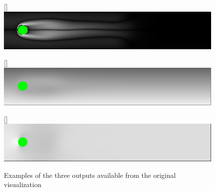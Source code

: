 \begin{figure}[ht]
    \centering
    [\linewidth]{\includegraphics[width=\linewidth,natwidth=660,natheight=120]{Ch20Research/figures/output_zeta.png}
    }
    
    [\linewidth]{\includegraphics[width=\linewidth,natwidth=660,natheight=120]{Ch20Research/figures/output_psi.png}
    }
    
    [\linewidth]{\includegraphics[width=\linewidth,natwidth=660,natheight=120]{Ch20Research/figures/output_pressure.png}
    }
    \caption{Examples of the three outputs available from the original visualization}%
    \label{fig:ppms}
\end{figure}